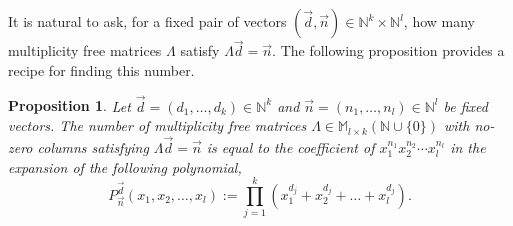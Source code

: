 \documentclass[12pt,a4paper]{amsart}
\theoremstyle{plain}
\newtheorem{prop}[theorem]{Proposition}
\theoremstyle{definition}
\theoremstyle{remark}
\numberwithin{equation}{section}
\theoremstyle{ser}
\theoremstyle{serr}
\theoremstyle{ser}
\theoremstyle{ser}
\theoremstyle{collabquestion}
\newcommand{\N}{\mathbb{N}}
\newcommand{\<}{\langle}
\renewcommand{\>}{\rangle}
\begin{document}
It is natural to ask, for a fixed pair of vectors $(\vec{d},\vec{n})\in \N^k \times \N^l$, how many multiplicity free matrices $\Lambda$ satisfy $\Lambda \vec{d}=\vec{n}$.
The following proposition provides a recipe for finding this number.

\begin{prop}\label{prop:num_of_mult_free}
    Let $\vec{d}=(d_1, \dots, d_k) \in \N^k$ and $\vec{n} =(n_1, \dots, n_l)\in \mathbb{N}^l$ be fixed vectors. The number of multiplicity free matrices $\Lambda \in \mathbb{M}_{l\times k}(\mathbb{N} \cup \{0\})$ with no-zero columns satisfying $\Lambda \vec{d} = \vec{n}$ is equal to the coefficient of $x_1^{n_1} x_2^{n_2} \cdots x_l^{n_l}$ in the expansion of the following polynomial,
    $$P_{\vec{n}}^{\vec{d}}(x_1, x_2, \dots, x_l) := \prod_{j=1}^k \left( x_1^{d_j} + x_2^{d_j} + \dots + x_l^{d_j} \right).$$
\end{prop}
\end{document}
